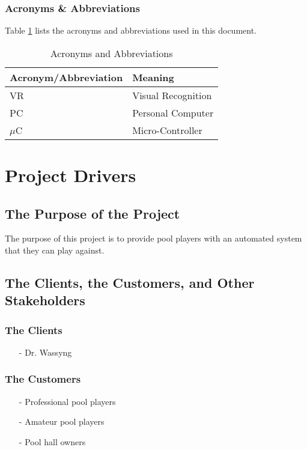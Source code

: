 \documentclass[titlepage]{article}
\begin{document}
\newpage
\subsubsection{Acronyms \& Abbreviations}
Table \ref{tab:Acronyms} lists the acronyms and abbreviations used in this document.
\begin{table}[h!]
\centering
\caption{Acronyms and Abbreviations}
\begin{tabular}{| p{6cm} | p{6cm} |}\hline
	\textbf{Acronym/Abbreviation}	&\textbf{Meaning}\\\hline
	VR								&Visual Recognition\\\hline
	PC								&Personal Computer\\\hline
	$\mu$C							&Micro-Controller\\\hline
\end{tabular}
\label{tab:Acronyms}
\end{table}


\section{Project Drivers}
\subsection{The Purpose of the Project}
The purpose of this project is to provide pool players with an automated system that they can play against.

\subsection{The Clients, the Customers, and Other Stakeholders}
\subsubsection{The Clients}
\begin{itemize}
	\item[-] Dr. Wassyng
\end{itemize}
\subsubsection{The Customers}
\begin{itemize}
	\item[-] Professional pool players
	\item[-] Amateur pool players
	\item[-] Pool hall owners
\end{itemize}
\end{document}
